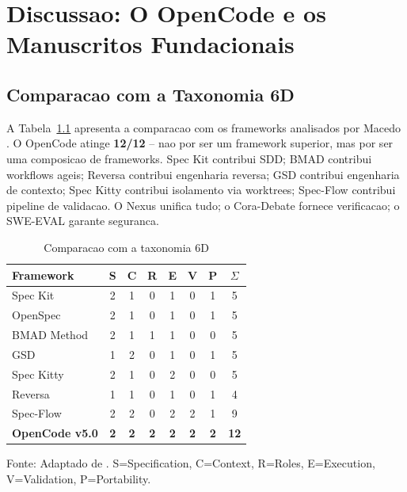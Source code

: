 \documentclass[12pt,a4paper,oneside,sumario=tradicional,chapter=TITLE,section=TITLE,subsection=TITLE,english,brazil]{abntex2}
\begin{document}
\cleardoublepage

\chapter{Discussao: O OpenCode e os Manuscritos Fundacionais}

\section{Comparacao com a Taxonomia 6D}

A Tabela~\ref{tab:tax} apresenta a comparacao com os frameworks analisados por Macedo \cite{macedo2026fromprompt}. O OpenCode atinge \textbf{12/12} -- nao por ser um framework superior, mas por ser uma composicao de frameworks. Spec Kit contribui SDD; BMAD contribui workflows ageis; Reversa contribui engenharia reversa; GSD contribui engenharia de contexto; Spec Kitty contribui isolamento via worktrees; Spec-Flow contribui pipeline de validacao. O Nexus unifica tudo; o Cora-Debate fornece verificacao; o SWE-EVAL garante seguranca.

\begin{table}[H]\centering\caption{Comparacao com a taxonomia 6D}\label{tab:tax}
\begin{tabular}{lccccccc}\toprule\textbf{Framework} & \textbf{S} & \textbf{C} & \textbf{R} & \textbf{E} & \textbf{V} & \textbf{P} & \textbf{$\Sigma$} \\\midrule
Spec Kit & 2 & 1 & 0 & 1 & 0 & 1 & 5 \\
OpenSpec & 2 & 1 & 0 & 1 & 0 & 1 & 5 \\
BMAD Method & 2 & 1 & 1 & 1 & 0 & 0 & 5 \\
GSD & 1 & 2 & 0 & 1 & 0 & 1 & 5 \\
Spec Kitty & 2 & 1 & 0 & 2 & 0 & 0 & 5 \\
Reversa & 1 & 1 & 0 & 1 & 0 & 1 & 4 \\
Spec-Flow & 2 & 2 & 0 & 2 & 2 & 1 & 9 \\\midrule
\textbf{OpenCode v5.0} & \textbf{2} & \textbf{2} & \textbf{2} & \textbf{2} & \textbf{2} & \textbf{2} & \textbf{12} \\\bottomrule
\end{tabular}
\small\vspace{2pt}Fonte: Adaptado de \cite{macedo2026fromprompt}. S=Specification, C=Context, R=Roles, E=Execution, V=Validation, P=Portability.
\end{table}
\end{document}
